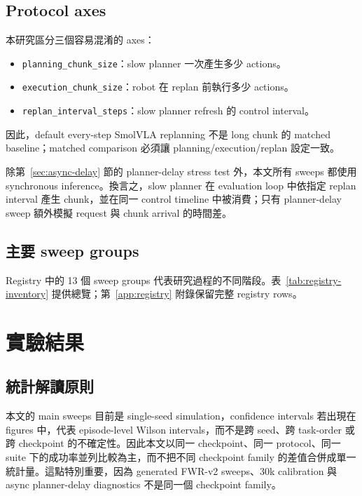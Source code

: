 \documentclass[12pt,a4paper,oneside]{report}
\newcommand{\smolvla}{SmolVLA}
\begin{document}
\section{Protocol axes}

本研究區分三個容易混淆的 axes：
\begin{itemize}
  \item \texttt{planning\_chunk\_size}：slow planner 一次產生多少 actions。
  \item \texttt{execution\_chunk\_size}：robot 在 replan 前執行多少 actions。
  \item \texttt{replan\_interval\_steps}：slow planner refresh 的 control interval。
\end{itemize}
因此，default every-step \smolvla{} replanning 不是 long chunk 的 matched baseline；matched comparison 必須讓 planning/execution/replan 設定一致。

除第~\ref{sec:async-delay} 節的 planner-delay stress test 外，本文所有 sweeps 都使用 synchronous inference。換言之，slow planner 在 evaluation loop 中依指定 replan interval 產生 chunk，並在同一 control timeline 中被消費；只有 planner-delay sweep 額外模擬 request 與 chunk arrival 的時間差。

\section{主要 sweep groups}

Registry 中的 13 個 sweep groups 代表研究過程的不同階段。表~\ref{tab:registry-inventory} 提供總覽；第~\ref{app:registry} 附錄保留完整 registry rows。



\chapter{實驗結果}
\label{chap:results}

\section{統計解讀原則}

本文的 main sweeps 目前是 single-seed simulation，confidence intervals 若出現在 figures 中，代表 episode-level Wilson intervals，而不是跨 seed、跨 task-order 或跨 checkpoint 的不確定性。因此本文以同一 checkpoint、同一 protocol、同一 suite 下的成功率並列比較為主，而不把不同 checkpoint family 的差值合併成單一統計量。這點特別重要，因為 generated FWR-v2 sweeps、30k calibration 與 async planner-delay diagnostics 不是同一個 checkpoint family。
\end{document}
